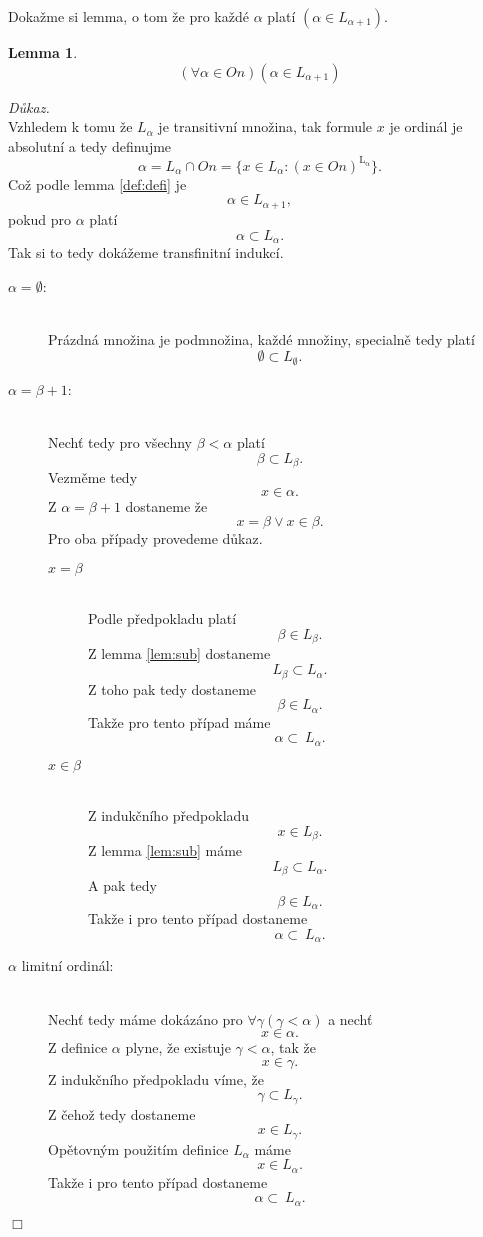 \documentclass[12pt,a4paper]{article}
\newtheorem{lemma}[veta]{Lemma}
\newenvironment{proof}
{\noindent \textit{D\r{u}kaz.}}
{\hspace*{\fill} $\Box$}
\begin{document}
Doka\v{z}me si lemma, o tom \v{z}e pro ka\v{z}d\'{e} $ \alpha  $ plat\'{i} $ (\alpha \in  L_{\alpha+1}) $.
\begin{lemma}
\label{lem:ord}
\[ (\forall \alpha \in  \textit{On})(\alpha \in  L_{\alpha+1}) \]
\end{lemma}
\begin{proof}~\\
Vzhledem k tomu \v{z}e $ L_\alpha $ je transitivn\'{i} mno\v{z}ina, tak formule  $ x $ je ordin\'{a}l  je absolutn\'{i}
a tedy definujme 
\[ \alpha = L_\alpha \cap  \textit{On} = \{x \in L_\alpha : (x \in  \textit{On})^\mathrm{L_\alpha}  \} .\]
Co\v{z} podle lemma \ref{def:defi} je 
\[ \alpha \in L_{\alpha+1} ,\]
pokud pro $  \alpha $ plat\'{i} \[ \alpha \subset L_\alpha. \]
Tak si to tedy dok\'{a}\v{z}eme transfinitn\'{i} indukc\'{i}.
~\begin{description}
\item[$ \alpha=\emptyset $:]~\\ 
Pr\'{a}zdn\'{a} mno\v{z}ina je podmno\v{z}ina, ka\v{z}d\'{e} mno\v{z}iny, specialn\v{e} tedy plat\'{i}
\[ \emptyset \subset L_\emptyset.  \]
\item[$ \alpha=\beta+1 $:] ~\\ 
Nech\v{t} tedy pro v\v{s}echny $ \beta < \alpha $ plat\'{i} \[ \beta \subset L_\beta  .\] Vezm\v{e}me tedy \[  x \in \alpha . \] Z $ \alpha=\beta+1 $ dostaneme \v{z}e  \[ x=\beta \vee x \in \beta . \]
Pro oba p\v{r}\'{i}pady provedeme d\r{u}kaz.
\begin{description}
  \item[$ x=\beta $] ~\\ 
  Podle p\v{r}edpokladu plat\'{i}
\[ \beta \in L_\beta  .\]
Z lemma \ref{lem:sub} dostaneme
\[ L_\beta \subset L_\alpha .\]
Z toho pak tedy dostaneme
\[ \beta \in L_\alpha .\]
Tak\v{z}e pro tento p\v{r}\'{i}pad m\'{a}me
\[ \alpha \subset \ L_\alpha . \]
  \item[$ x \in \beta $] ~\\ 
  Z induk\v{c}n\'{i}ho p\v{r}edpokladu 
\[ x \in L_\beta  .\]
Z lemma \ref{lem:sub} m\'{a}me 
\[ L_\beta \subset L_\alpha .\]
A pak tedy \[ \beta \in L_\alpha .\]
Tak\v{z}e i pro tento p\v{r}\'{i}pad dostaneme
\[ \alpha \subset \ L_\alpha . \]
\end{description}
\item[$ \alpha  $ limitn\'{i} ordin\'{a}l:]~\\
Nech\v{t} tedy m\'{a}me  dok\'{a}z\'{a}no pro $ \forall \gamma ( \gamma <  \alpha )$ a nech\v{t} 
\[  x \in \alpha .\]
Z definice $ \alpha  $ plyne, \v{z}e existuje   $   \gamma <  \alpha $, tak \v{z}e 
\[  x \in \gamma .\]
Z induk\v{c}n\'{i}ho p\v{r}edpokladu v\'{i}me, \v{z}e 
\[  \gamma \subset L_\gamma .\]
Z \v{c}eho\v{z} tedy dostaneme
\[  x \in L_\gamma .\]
Op\v{e}tovn\'{y}m pou\v{z}it\'{i}m definice $ L_\alpha  $ m\'{a}me 
\[  x \in L_\alpha.\]
Tak\v{z}e i pro tento p\v{r}\'{i}pad dostaneme
\[ \alpha \subset \ L_\alpha . \]
\end{description}
\end{proof}
\newpage
\end{document}
